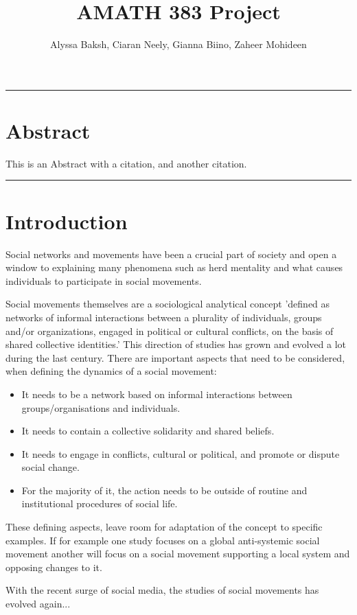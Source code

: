 \documentclass{article}
\title{AMATH 383 Project}
\author{
    Alyssa Baksh, 
    Ciaran Neely,
    Gianna Biino,
    Zaheer Mohideen
}
\begin{document}
    \maketitle
    
    \hrule
    \section{Abstract}
    This is an Abstract with a citation\cite{kaveh_defining_2020}, and another citation\cite{small_movements_2021}.
    \hrule
    \section{Introduction}
    Social networks and movements have been a crucial part of society and open a window to explaining many phenomena such as herd mentality and what causes individuals to participate in social movements\cite{diani_networks_2013}.
    
    Social movements themselves are a sociological analytical concept 'defined as networks of informal interactions between a plurality of individuals, groups and/or organizations, engaged in political or cultural conflicts, on the basis of shared collective identities.' This direction of studies has grown and evolved a lot during the last century. There are important aspects that need to be considered, when defining the dynamics of a social movement: 
    \begin{itemize}
    \item It needs to be a network based on informal interactions between groups/organisations and individuals. 
    \item It needs to contain a collective solidarity and shared beliefs.
    \item It needs to engage in conflicts, cultural or political, and promote or dispute social change.
    \item  For the majority of it, the action needs to be outside of routine and institutional procedures of social life.
    \end{itemize}
    These defining aspects, leave room for adaptation of the concept to specific examples. If for example one study focuses on a global anti-systemic social movement another will focus on a social movement supporting a local system and opposing changes to it\cite{diani_concept_1992}.
    
    With the recent surge of social media, the studies of social movements has evolved again...
    
\end{document}
